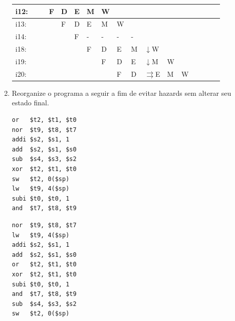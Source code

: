 \documentclass{article}
\begin{document}
\begin{enumerate}
\begin{table}[H]
\begin{tabular}{|l|l|l|l|l|l|l|l|l|l|l|l|l|l|l|l|l|}
i12: &     &     &  F  &  D  &  E  &  M  &  W  &     &     &     &     &     &     &     &     &     \\ \hline
i13: &     &     &     &  F  &  D  &  E  &  M  &  W  &     &     &     &     &     &     &     &     \\ \hline
i14: &     &     &     &     &  F  &  -  &  -  &  -  &  -  &     &     &     &     &     &     &     \\ \hline
i18: &     &     &     &     &     &  F  &  D  &  E  &  M  &$\downarrow$W  &     &     &     &     &     &     \\ \hline
i19: &     &     &     &     &     &     &  F  &  D  &  E  &$\downarrow$M  &  W  &     &     &     &     &     \\ \hline
i20: &     &     &     &     &     &     &     &  F  &  D  &$\rightrightarrows$E  &  M  &  W  &     &     &     &     \\ \hline
\end{tabular}
\end{table}

\item Reorganize o programa a seguir a fim de evitar hazards sem alterar seu estado final.

\begin{center}
    \begin{minipage}{0.25\textwidth}
        \begin{lstlisting}[frame=single]
or   $t2, $t1, $t0
nor  $t9, $t8, $t7
addi $s2, $s1, 1
add  $s2, $s1, $s0
sub  $s4, $s3, $s2
xor  $t2, $t1, $t0
sw   $t2, 0($sp)
lw   $t9, 4($sp)
subi $t0, $t0, 1
and  $t7, $t8, $t9
        \end{lstlisting}
    \end{minipage}
\end{center}

\begin{center}
    \begin{minipage}{0.25\textwidth}
        \begin{lstlisting}[frame=single]
nor  $t9, $t8, $t7
lw   $t9, 4($sp)
addi $s2, $s1, 1
add  $s2, $s1, $s0
or   $t2, $t1, $t0
xor  $t2, $t1, $t0
subi $t0, $t0, 1
and  $t7, $t8, $t9
sub  $s4, $s3, $s2
sw   $t2, 0($sp)
        \end{lstlisting}
    \end{minipage}
\end{center}

\end{enumerate}
\end{document}
